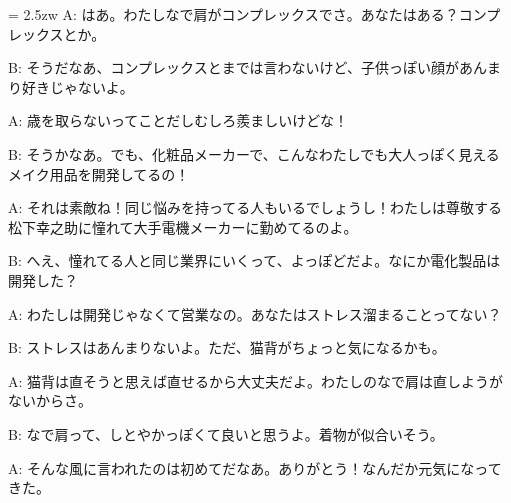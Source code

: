\documentclass[11pt]{amsart}
\title{}
\author{}
\newenvironment{hangall}[1]{\hangindent = 2.5zw\everypar{\hangindent = 2.5zw}}{}
\begin{document}
\maketitle
\begin{hangall}{}%
A: はあ。わたしなで肩がコンプレックスでさ。あなたはある？コンプレックスとか。

B: そうだなあ、コンプレックスとまでは言わないけど、子供っぽい顔があんまり好きじゃないよ。

A: 歳を取らないってことだしむしろ羨ましいけどな！

B: そうかなあ。でも、化粧品メーカーで、こんなわたしでも大人っぽく見えるメイク用品を開発してるの！

A: それは素敵ね！同じ悩みを持ってる人もいるでしょうし！わたしは尊敬する松下幸之助に憧れて大手電機メーカーに勤めてるのよ。

B: へえ、憧れてる人と同じ業界にいくって、よっぽどだよ。なにか電化製品は開発した？

A: わたしは開発じゃなくて営業なの。あなたはストレス溜まることってない？

B: ストレスはあんまりないよ。ただ、猫背がちょっと気になるかも。

A: 猫背は直そうと思えば直せるから大丈夫だよ。わたしのなで肩は直しようがないからさ。

B: なで肩って、しとやかっぽくて良いと思うよ。着物が似合いそう。

A: そんな風に言われたのは初めてだなあ。ありがとう！なんだか元気になってきた。
\end{hangall}
\end{document}

